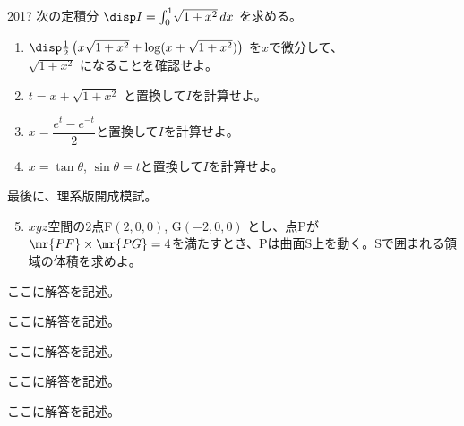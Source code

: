 \begin{prob}{201}{\hosi ?}{}
 次の定積分 $\disp I=\int_0^1\! \sqrt{1+x^2} \,dx$ を求める。
 \begin{enumerate}
  \item $\disp \frac{1}{2}\left(x\sqrt{1+x^2}+\log (x+\sqrt{1+x^2})\right)$ を$x$で微分して、\\ $\sqrt{1+x^2}$ になることを確認せよ。
  \item $t=x+\sqrt{1+x^2}$ と置換して$I$を計算せよ。
  \item $x=\dfrac{e^t-e^{-t}}{2}$と置換して$I$を計算せよ。
  \item $x=\tan\theta$, $\sin\theta=t$と置換して$I$を計算せよ。
 \end{enumerate}

 最後に、理系版開成模試。
 \begin{enumerate}
  \setcounter{enumi}{4}
  \item $xyz$空間の2点F$(2,0,0)$, G$(-2,0,0)$ とし、点Pが$\mr{PF}\times\mr{PG}=4$を満たすとき、Pは曲面S上を動く。Sで囲まれる領域の体積を求めよ。
 \end{enumerate}
\end{prob}
ここに解答を記述。

ここに解答を記述。

ここに解答を記述。

ここに解答を記述。

ここに解答を記述。